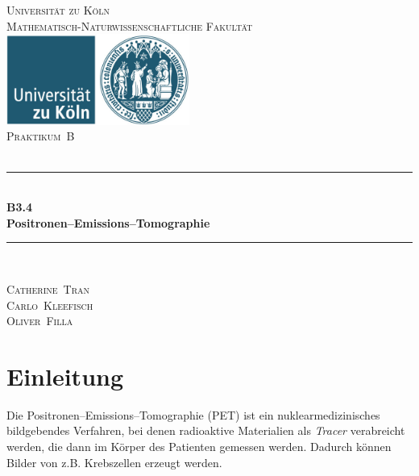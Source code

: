 \documentclass[12pt,a4paper]{scrartcl}
\numberwithin{equation}{section} %
\newcommand{\HRule}{\rule{\linewidth}{0.7mm}}
\begin{document}
\begin{titlepage}
	\pagestyle{empty}

	\begin{center}

	\textsc{\LARGE Universität zu Köln }\\ [0.4cm]
	\textsc{Mathematisch-Naturwissenschaftliche Fakultät} \\[1.5cm]

	\includegraphics[width=0.45\textwidth]{../media/uni.jpg}\\[1.5cm]  %

	\textsc{\Large Praktikum~B}\\[2mm]
	\textsc{}\\[10mm]
	\HRule \\[0.4cm]

		{	\Huge \bfseries B3.4}\\[0.4cm]
			{	\huge \bfseries Positronen--Emissions--Tomographie}\\[0.3cm]
	
	\HRule \\[3cm]

 	\begin{center}
		\textsc{\Large Catherine~Tran } \\[3pt]
		\textsc{\Large Carlo~Kleefisch } \\[3pt]
		\textsc{\Large Oliver~Filla } \\[3pt]
	\end{center}
	\end{center}
\end{titlepage}

\newpage
\tableofcontents
\newpage

\hypertarget{einleitung}{%
\section{Einleitung}\label{einleitung}}

Die Positronen--Emissions--Tomographie (PET) ist ein nuklearmedizinisches bildgebendes Verfahren, bei denen radioaktive Materialien als \emph{Tracer} verabreicht werden, die dann im Körper des Patienten gemessen werden. Dadurch können Bilder von z.B. Krebszellen erzeugt werden.
\end{document}
